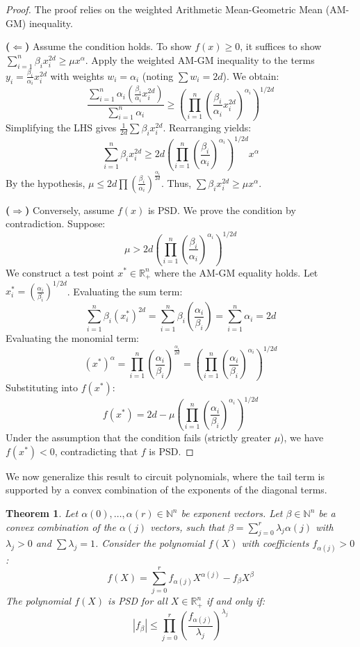 \documentclass{article}
\newtheorem{theorem}{Theorem}
\begin{document}
\begin{proof}
The proof relies on the weighted Arithmetic Mean-Geometric Mean (AM-GM) inequality.

\noindent \textbf{(\(\Leftarrow\))} Assume the condition holds. To show $f(x) \geq 0$, it suffices to show 
$\sum_{i=1}^n \beta_i x_i^{2d} \geq \mu x^{\alpha}$.
Apply the weighted AM-GM inequality to the terms $y_i = \frac{\beta_i}{\alpha_i} x_i^{2d}$ with weights 
$w_i = \alpha_i$ (noting $\sum w_i = 2d$). We obtain:
\[
   \frac{\sum_{i=1}^n \alpha_i \left( \frac{\beta_i}{\alpha_i} x_i^{2d} \right)}{\sum_{i=1}^n \alpha_i} \geq \left( \prod_{i=1}^n \left( \frac{\beta_i}{\alpha_i} x_i^{2d} \right)^{\alpha_i} \right)^{1/2d}
\]
Simplifying the LHS gives $\frac{1}{2d} \sum \beta_i x_i^{2d}$. Rearranging yields:
\[
   \sum_{i=1}^n \beta_i x_i^{2d} \geq 2d \left( \prod_{i=1}^n \left( \frac{\beta_i}{\alpha_i} \right)^{\alpha_i} \right)^{1/2d} x^{\alpha}
\]
By the hypothesis, $\mu \leq 2d \prod (\frac{\beta_i}{\alpha_i})^{\frac{\alpha_i}{2d}}$. 
Thus, $\sum \beta_i x_i^{2d} \geq \mu x^\alpha$.

\noindent \textbf{(\(\Rightarrow\))} Conversely, assume $f(x)$ is PSD. We prove the condition by contradiction. Suppose:
\[
   \mu > 2d \left( \prod_{i=1}^n \left( \frac{\beta_i}{\alpha_i} \right)^{\alpha_i} \right)^{1/2d}
\]
We construct a test point $x^* \in \mathbb{R}_+^n$ where the AM-GM equality holds. 
Let $x_i^* = (\frac{\alpha_i}{\beta_i})^{1/2d}$.
Evaluating the sum term:
\[
   \sum_{i=1}^n \beta_i (x_i^*)^{2d} = \sum_{i=1}^n \beta_i \left(\frac{\alpha_i}{\beta_i}\right) = \sum_{i=1}^n \alpha_i = 2d
\]
Evaluating the monomial term:
\[
   (x^*)^{\alpha} = \prod_{i=1}^n \left( \frac{\alpha_i}{\beta_i} \right)^{\frac{\alpha_i}{2d}} = \left( \prod_{i=1}^n \left( \frac{\alpha_i}{\beta_i} \right)^{\alpha_i} \right)^{1/2d}
\]
Substituting into $f(x^*)$:
\[
   f(x^*) = 2d - \mu \left( \prod_{i=1}^n \left( \frac{\alpha_i}{\beta_i} \right)^{\alpha_i} \right)^{1/2d}
\]
Under the assumption that the condition fails (strictly greater $\mu$), we have $f(x^*) < 0$, contradicting that $f$ is PSD.
\end{proof}

We now generalize this result to circuit polynomials, where the tail term is supported by a convex combination of the 
exponents of the diagonal terms.

\begin{theorem}\label{thm:Circuit_PSD}
Let $\alpha(0), \dots, \alpha(r) \in \mathbb{N}^n$ be exponent vectors. Let $\beta \in \mathbb{N}^n$ be a convex 
combination of the $\alpha(j)$ vectors, such that $\beta = \sum_{j=0}^r \lambda_j \alpha(j)$ with $\lambda_j > 0$ 
and $\sum \lambda_j = 1$.
Consider the polynomial $f(X)$ with coefficients $f_{\alpha(j)} > 0$:
\[
   f(X) = \sum_{j=0}^r f_{\alpha(j)} X^{\alpha(j)} - f_{\beta} X^{\beta}
\]
The polynomial $f(X)$ is PSD for all $X \in \mathbb{R}_+^n$ if and only if:
\[
   |f_{\beta}| \leq \prod_{j=0}^r \left( \frac{f_{\alpha(j)}}{\lambda_j} \right)^{\lambda_j}
\]
\end{theorem}
\end{document}
